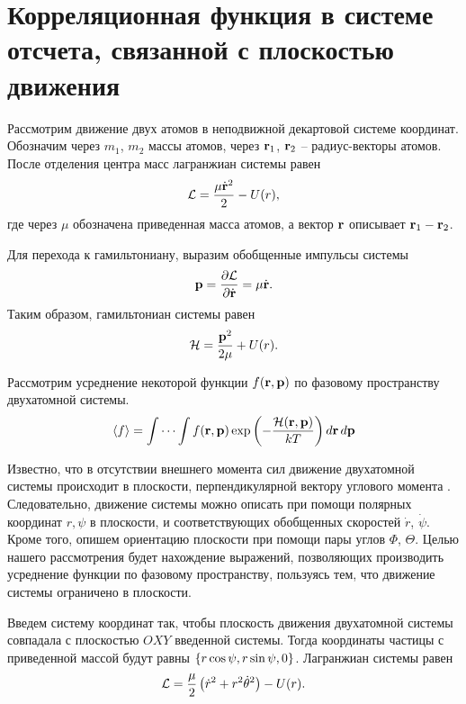\section{Корреляционная функция в системе отсчета, связанной с плоскостью движения}

Рассмотрим движение двух атомов в неподвижной декартовой системе координат. Обозначим через $m_1$, $m_2$ массы атомов, через $\mathbf{r}_1$, $\mathbf{r}_2$ -- радиус-векторы атомов. После отделения центра масс лагранжиан системы равен 
\begin{gather}
    \mathcal{L} = \frac{\mu \dot{\mathbf{r}}^2}{2} - U( r ),
\end{gather}
где через $\mu$ обозначена приведенная масса атомов, а вектор $\mathbf{r}$ описывает $\mathbf{r}_1 - \mathbf{r}_2$. \par
Для перехода к гамильтониану, выразим обобщенные импульсы системы
\begin{gather}
    \mathbf{p} = \frac{\partial \mathcal{L}}{\partial \dot{\mathbf{r}}} = \mu \dot{\mathbf{r}}.
\end{gather}
Таким образом, гамильтониан системы равен
\begin{gather}
    \mathcal{H} = \frac{\mathbf{p}^2}{2\mu} + U( r ).
\end{gather}

Рассмотрим усреднение некоторой функции $f(\mathbf{r}, \mathbf{p})$ по фазовому пространству двухатомной системы. 
\begin{gather}
    \langle f \rangle = \idotsint f(\mathbf{r}, \mathbf{p}) \exp \left( -\frac{\mathcal{H}(\mathbf{r},\mathbf{p})}{kT} \right) d \mathbf{r} \, d\mathbf{p} \label{two-atom-mean}
\end{gather}

Известно, что в отсутствии внешнего момента сил движение двухатомной системы происходит в плоскости, перпендикулярной вектору углового момента \cite{goldstein}. Следовательно, движение системы можно описать при помощи полярных координат $r, \psi$ в плоскости, и соответствующих обобщенных скоростей $\dot{r}$, $\dot{\psi}$. Кроме того, опишем ориентацию плоскости при помощи пары углов $\Phi$, $\Theta$. Целью нашего рассмотрения будет нахождение выражений, позволяющих производить усреднение функции по фазовому пространству, пользуясь тем, что движение системы ограничено в плоскости. \par
    Введем систему координат так, чтобы плоскость движения двухатомной системы совпадала с плоскостью $OXY$ введенной системы. Тогда координаты частицы с приведенной массой будут равны $\left\{ r \cos \psi, r \sin \psi, 0 \right\}$. Лагранжиан системы равен
\begin{gather}
    \mathcal{L} = \frac{\mu}{2} \left( \dot{r}^2 + r^2 \dot{\theta}^2 \right) - U(r). \label{two-atom-plane-lagrangian}
\end{gather}

